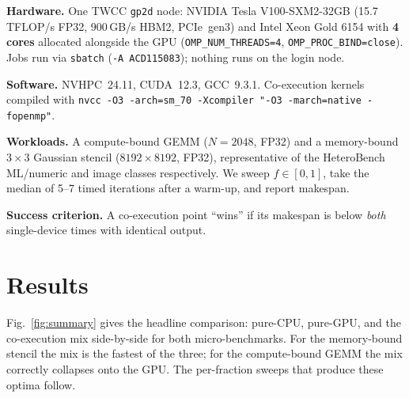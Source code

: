 \documentclass[conference]{IEEEtran}
\begin{document}
\textbf{Hardware.} One TWCC \texttt{gp2d} node: NVIDIA Tesla V100-SXM2-32GB (15.7 TFLOP/s
FP32, 900\,GB/s HBM2, PCIe~gen3) and Intel Xeon Gold 6154 with \textbf{4 cores}
allocated alongside the GPU (\texttt{OMP\_NUM\_THREADS=4}, \texttt{OMP\_PROC\_BIND=close}).
Jobs run via \texttt{sbatch} (\texttt{-A ACD115083}); nothing runs on the login node.

\textbf{Software.} NVHPC~24.11, CUDA~12.3, GCC~9.3.1. Co-execution kernels compiled with
\texttt{nvcc -O3 -arch=sm\_70 -Xcompiler "-O3 -march=native -fopenmp"}.

\textbf{Workloads.} A compute-bound GEMM ($N{=}2048$, FP32) and a memory-bound
$3{\times}3$ Gaussian stencil ($8192{\times}8192$, FP32), representative of the
HeteroBench ML/numeric and image classes respectively. We sweep
$f\in[0,1]$, take the median of 5--7 timed iterations after a warm-up, and report makespan.

\textbf{Success criterion.} A co-execution point ``wins'' if its makespan is below
\emph{both} single-device times with identical output.

\section{Results}

Fig.~\ref{fig:summary} gives the headline comparison: pure-CPU, pure-GPU, and the
co-execution mix side-by-side for both micro-benchmarks. For the memory-bound stencil the
mix is the fastest of the three; for the compute-bound GEMM the mix correctly collapses
onto the GPU. The per-fraction sweeps that produce these optima follow.
\end{document}
